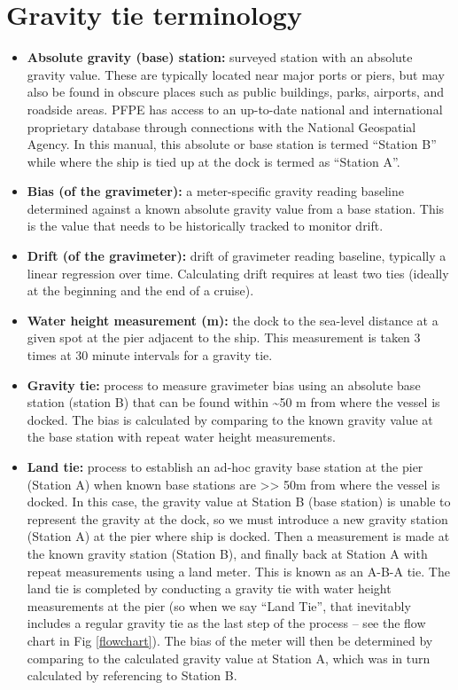 \documentclass{pfpe-manual}
\begin{document}
\section{Gravity tie terminology}
\begin{itemize}
\item \textbf{Absolute gravity (base) station:} surveyed station with an absolute gravity value. These are typically located near major ports or piers, but may also be found in obscure places such as public buildings, parks, airports, and roadside areas. PFPE has access to an up-to-date national and international proprietary database through connections with the National Geospatial Agency. In this manual, this absolute or base station is termed “Station B” while where the ship is tied up at the dock is termed as “Station A”. 

\item \textbf{Bias (of the gravimeter):} a meter-specific gravity reading baseline determined against a known absolute gravity value from a base station. This is the value that needs to be historically tracked to monitor drift. 

\item \textbf{Drift (of the gravimeter):} drift of gravimeter reading baseline, typically a linear regression over time. Calculating drift requires at least two ties (ideally at the beginning and the end of a cruise).  

\item \textbf{Water height measurement (m):} the dock to the sea-level distance at a given spot at the pier adjacent to the ship. This measurement is taken 3 times at 30 minute intervals for a gravity tie.

\item \textbf{Gravity tie:} process to measure gravimeter bias using an absolute base station (station B) that can be found within \textasciitilde50 m from where the vessel is docked. The bias is calculated by comparing to the known gravity value at the base station with repeat water height measurements.

\item \textbf{Land tie:} process to establish an ad-hoc gravity base station at the pier (Station A) when known base stations are >> 50m from where the vessel is docked. In this case, the gravity value at Station B (base station) is unable to represent the gravity at the dock, so we must introduce a new gravity station (Station A) at the pier where ship is docked. Then a measurement is made at the known gravity station (Station B), and finally back at Station A with repeat measurements using a land meter.  This is known as an A-B-A tie. The land tie is completed by conducting a gravity tie with water height measurements at the pier (so when we say “Land Tie”, that inevitably includes a regular gravity tie as the last step of the process – see the flow chart in Fig \ref{flowchart}). The bias of the meter will then be determined by comparing to the calculated gravity value at Station A, which was in turn calculated by referencing to Station B.

\end{itemize}
\end{document}
